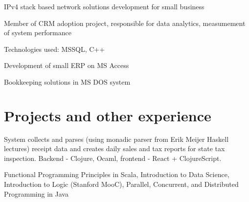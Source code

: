 \documentclass[]{plushcv}
\begin{document}
\begin{minipage}[t]{0.70\textwidth}
\begin{tightemize}
\sectionsep
\item IPv4 stack based network solutions development for small business
\item Member of CRM adoption project, responsible for data analytics, measumement of system performance
\item Technologies used: MSSQL, C++
\end{tightemize}
\sectionsep

\begin{tightemize}
\sectionsep
\item Development of small ERP on MS Access
\item Bookkeeping solutions in MS DOS system
\end{tightemize}
\sectionsep


\section{Projects and other experience}

\begin{tightemize}
\item System collects and parses (using monadic parser from Erik Meijer Haskell lectures) receipt data and creates daily sales and tax reports for state tax inspection. Backend - Clojure, Ocaml, frontend - React + ClojureScript.
\end{tightemize}
\begin{tightemize}
\item Functional Programming Principles in Scala, Introduction to Data Science, Introduction to Logic (Stanford MooC), Parallel, Concurrent, and Distributed Programming in Java
\end{tightemize}
\sectionsep


%
%

\end{minipage} 
\end{document}
